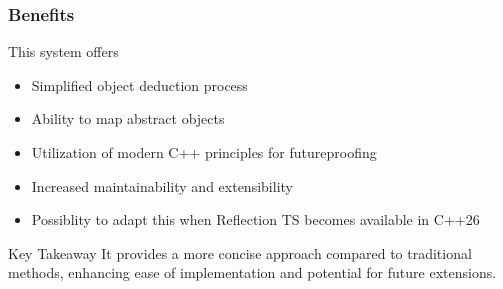\begin{frame}
    \frametitle{Benefits}
    
    This system offers
    \begin{itemize}
      \item Simplified object deduction process
      \item Ability to map abstract objects
      \item Utilization of modern C++ principles for futureproofing
      \item Increased maintainability and extensibility
      \item Possiblity to adapt this when Reflection TS becomes available in C++26
    \end{itemize}
    \pause
    \begin{block}{Key Takeaway}
        It provides a more concise approach compared to traditional methods, enhancing ease of implementation and potential for future extensions.
    \end{block}
\end{frame}